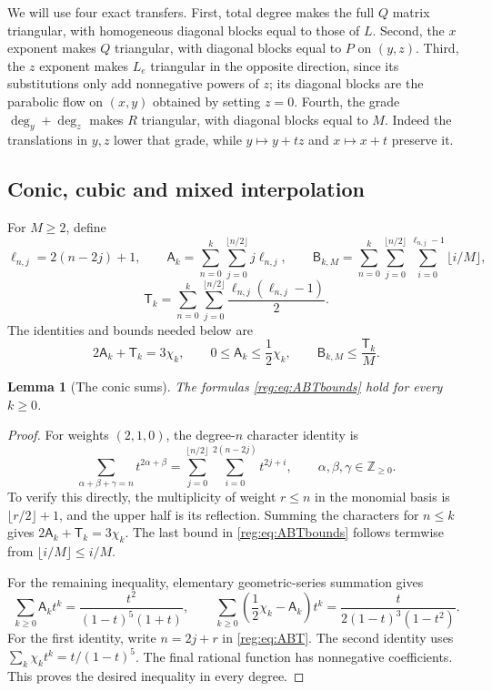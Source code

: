 \documentclass[11pt]{amsart}
\newtheorem{lemma}[theorem]{Lemma}
\theoremstyle{definition}
\theoremstyle{remark}
\numberwithin{equation}{section}
\begin{document}
We will use four exact transfers. First, total degree makes the full $Q$ matrix triangular, with homogeneous diagonal blocks equal to those of $L$. Second, the $x$ exponent makes $Q$ triangular, with diagonal blocks equal to $P$ on $(y,z)$. Third, the $z$ exponent makes $L_e$ triangular in the opposite direction, since its substitutions only add nonnegative powers of $z$; its diagonal blocks are the parabolic flow on $(x,y)$ obtained by setting $z=0$. Fourth, the grade $\deg_y+\deg_z$ makes $R$ triangular, with diagonal blocks equal to $M$. Indeed the translations in $y,z$ lower that grade, while $y\mapsto y+tz$ and $x\mapsto x+t$ preserve it. 

\subsection{Conic, cubic and mixed interpolation}\label{reg:interpolation}
For $M\ge2$, define
\begin{equation}\label{reg:eq:ABT}
 \ell_{n,j}=2(n-2j)+1,\qquad
 \mathsf A_k=\sum_{n=0}^k\sum_{j=0}^{\lfloor n/2\rfloor}j\ell_{n,j},\qquad
 \mathsf B_{k,M}=\sum_{n=0}^k\sum_{j=0}^{\lfloor n/2\rfloor}\sum_{i=0}^{\ell_{n,j}-1}\lfloor i/M\rfloor,
\end{equation}
\[
 \mathsf T_k=\sum_{n=0}^k\sum_{j=0}^{\lfloor n/2\rfloor}\frac{\ell_{n,j}(\ell_{n,j}-1)}2.
\]
The identities and bounds needed below are
\begin{equation}\label{reg:eq:ABTbounds}
 2\mathsf A_k+\mathsf T_k=3\chi_k,\qquad 0\le\mathsf A_k\le\frac12\chi_k,\qquad \mathsf B_{k,M}\le\frac{\mathsf T_k}{M}.
\end{equation}

\begin{lemma}[The conic sums]\label{reg:lem:sums}
The formulas \eqref{reg:eq:ABTbounds} hold for every $k\ge0$.
\end{lemma}
\begin{proof}
For weights $(2,1,0)$, the degree-$n$ character identity is
\[
\sum_{\alpha+\beta+\gamma=n}t^{2\alpha+\beta}=\sum_{j=0}^{\lfloor n/2\rfloor}\sum_{i=0}^{2(n-2j)}t^{2j+i},\qquad \alpha,\beta,\gamma\in\mathbb Z_{\ge0}.
\]
To verify this directly, the multiplicity of weight $r\le n$ in the monomial basis is $\lfloor r/2\rfloor+1$, and the upper half is its reflection. Summing the characters for $n\le k$ gives $2\mathsf A_k+\mathsf T_k=3\chi_k$. The last bound in \eqref{reg:eq:ABTbounds} follows termwise from $\lfloor i/M\rfloor\le i/M$.

For the remaining inequality, elementary geometric-series summation gives
\[
 \sum_{k\ge0}\mathsf A_k t^k=\frac{t^2}{(1-t)^5(1+t)},\qquad
 \sum_{k\ge0}\left(\frac12\chi_k-\mathsf A_k\right)t^k=\frac{t}{2(1-t)^3(1-t^2)}.
\]
For the first identity, write $n=2j+r$ in \eqref{reg:eq:ABT}. The second identity uses $\sum_k\chi_kt^k=t/(1-t)^5$. The final rational function has nonnegative coefficients. This proves the desired inequality in every degree.
\end{proof}
\end{document}
